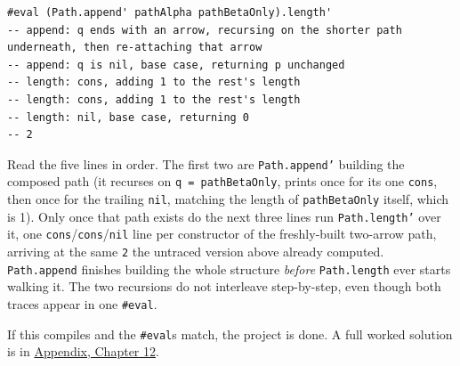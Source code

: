 \begin{pblproject}
\begin{lstlisting}
#eval (Path.append' pathAlpha pathBetaOnly).length'
-- append: q ends with an arrow, recursing on the shorter path underneath, then re-attaching that arrow
-- append: q is nil, base case, returning p unchanged
-- length: cons, adding 1 to the rest's length
-- length: cons, adding 1 to the rest's length
-- length: nil, base case, returning 0
-- 2
\end{lstlisting}

Read the five lines in order. The first two are \texttt{Path.append'} building the composed path (it recurses on \texttt{q = pathBetaOnly}, prints once for its one \texttt{cons}, then once for the trailing \texttt{nil}, matching the length of \texttt{pathBetaOnly} itself, which is 1). Only once that path exists do the next three lines run \texttt{Path.length'} over it, one \texttt{cons}/\texttt{cons}/\texttt{nil} line per constructor of the freshly-built two-arrow path, arriving at the same \texttt{2} the untraced version above already computed. \texttt{Path.append} finishes building the whole structure \emph{before} \texttt{Path.length} ever starts walking it. The two recursions do not interleave step-by-step, even though both traces appear in one \texttt{\#eval}.

If this compiles and the \texttt{\#eval}s match, the project is done. A full worked solution is in \hyperref[sec:15-appendix-solutions:12-chapter-12:1]{Appendix, Chapter 12}.

\end{pblproject}
